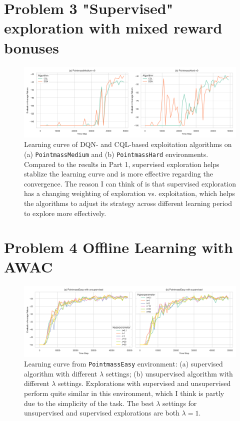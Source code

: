 \documentclass[10pt, letterpaper]{article}
\begin{document}
\pagebreak
\section*{Problem 3 "Supervised" exploration with mixed reward bonuses}

\begin{figure}[h!]
    \centering
    \includegraphics[width=\textwidth]{q3.png}
    \caption{Learning curve of DQN- and CQL-based exploitation algorithms on (a) \texttt{PointmassMedium} and (b) \texttt{PointmassHard} environments.  Compared to the results in Part 1, supervised exploration helps stablize the learning curve and is more effective regarding the convergence. The reason I can think of is that supervised exploration has a changing weighting of exploration vs. exploitation, which helps the algorithms to adjust its strategy across different learning period to explore more effectively.}
\end{figure}

\pagebreak
\section*{Problem 4 Offline Learning with AWAC}

\begin{figure}[h!]
    \centering
    \includegraphics[width=\textwidth]{q4_easy.png}
    \caption{Learning curve from \texttt{PointmassEasy} environment: (a) supervised algorithm with different $\lambda$ settings; (b) unsupervised algorithm with different $\lambda$ settings. Explorations with supervised and unsupervised perform quite similar in this environment, which I think is partly due to the simplicity of the task. The best $\lambda$ settings for unsupervised and supervised explorations are both $\lambda=1$.}
\end{figure}
\end{document}
